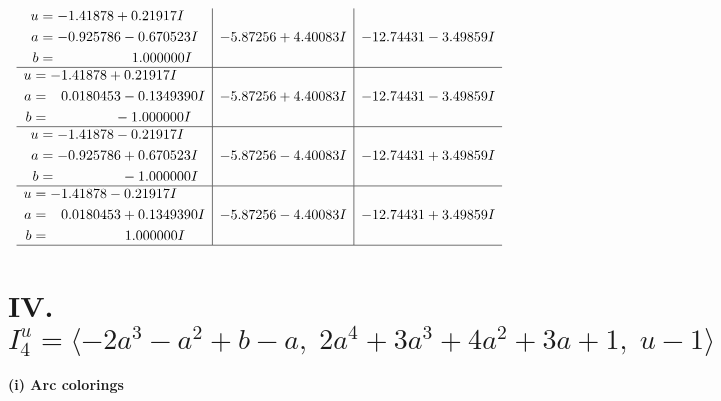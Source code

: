 \documentclass[1p]{elsarticle_modified}
\theoremstyle{definition}
\begin{document}
$$\begin{array}{c|c|c}
\begin{aligned}
u &= -1.41878 + 0.21917 I \\
a &= -0.925786 - 0.670523 I \\
b &= \phantom{-0.000000 -}1.000000 I\end{aligned}
 & -5.87256 + 4.40083 I & -12.74431 - 3.49859 I \\ \hline\begin{aligned}
u &= -1.41878 + 0.21917 I \\
a &= \phantom{-}0.0180453 - 0.1349390 I \\
b &= \phantom{-0.000000 } -1.000000 I\end{aligned}
 & -5.87256 + 4.40083 I & -12.74431 - 3.49859 I \\ \hline\begin{aligned}
u &= -1.41878 - 0.21917 I \\
a &= -0.925786 + 0.670523 I \\
b &= \phantom{-0.000000 } -1.000000 I\end{aligned}
 & -5.87256 - 4.40083 I & -12.74431 + 3.49859 I \\ \hline\begin{aligned}
u &= -1.41878 - 0.21917 I \\
a &= \phantom{-}0.0180453 + 0.1349390 I \\
b &= \phantom{-0.000000 -}1.000000 I\end{aligned}
 & -5.87256 - 4.40083 I & -12.74431 + 3.49859 I\\
 \hline 
 \end{array}$$\newpage\newpage\renewcommand{\arraystretch}{1}
\centering \section*{IV. $I^u_{4}= \langle -2 a^3- a^2+b- a,\;2 a^4+3 a^3+4 a^2+3 a+1,\;u-1 \rangle$}
\flushleft \textbf{(i) Arc colorings}\\
\end{document}
